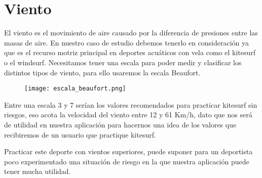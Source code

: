 \section{Viento}

El viento es el movimiento de aire causado por la diferencia de presiones entre las masas de aire. En nuestro caso de estudio debemos tenerlo en consideración ya que es el recurso motriz principal en deportes acuáticos con vela como el kitesurf o el windsurf. Necesitamos tener una escala para poder medir y clasificar los distintos tipos de viento, para ello usaremos la escala Beaufort. \cite{BEAUFORT}


\begin{figure}[hb]
\texttt{[image: escala\_beaufort.png]} 
\end{figure}

Entre una escala 3 y 7 serían los valores recomendados para practicar kitesurf sin riesgos, eso acota la velocidad del viento entre 12 y 61 Km/h, dato que nos será de utilidad en nuestra aplicación para hacernos una idea de los valores que recibiremos de un usuario que practique kitesurf. 

Practicar este deporte con vientos superiores, puede suponer para un deportista poco experimentado una situación de riesgo en la que nuestra aplicación puede tener mucha utilidad.